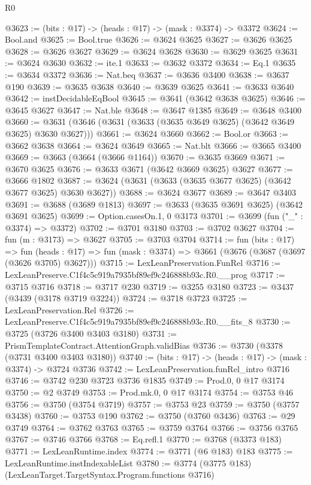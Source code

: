 \begin{lexlean}{R0}
\begin{coremodule}
@3623 := (bits : @17) -> (heads : @17) -> (mask : @3374) -> @3372
@3624 := Bool.and
@3625 := Bool.true
@3626 := @3624 @3625
@3627 := @3626 @3625
@3628 := @3626 @3627
@3629 := @3624 @3628
@3630 := @3629 @3625
@3631 := @3624 @3630
@3632 := ite.{1}
@3633 := @3632 @3372
@3634 := Eq.{1}
@3635 := @3634 @3372
@3636 := Nat.beq
@3637 := @3636 @3400
@3638 := @3637 @190
@3639 := @3635 @3638
@3640 := @3639 @3625
@3641 := @3633 @3640
@3642 := instDecidableEqBool
@3645 := @3641 (@3642 @3638 @3625)
@3646 := @3645 @3627
@3647 := Nat.ble
@3648 := @3647 @1385
@3649 := @3648 @3400
@3660 := @3631 (@3646 (@3631 (@3633 (@3635 @3649 @3625) (@3642 @3649 @3625) @3630 @3627)))
@3661 := @3624 @3660
@3662 := Bool.or
@3663 := @3662 @3638
@3664 := @3624 @3649
@3665 := Nat.blt
@3666 := @3665 @3400
@3669 := @3663 (@3664 (@3666 @1164))
@3670 := @3635 @3669
@3671 := @3670 @3625
@3676 := @3633 @3671 (@3642 @3669 @3625) @3627
@3677 := @3666 @1802
@3687 := @3624 (@3631 (@3633 (@3635 @3677 @3625) (@3642 @3677 @3625) @3630 @3627))
@3688 := @3624 @3677
@3689 := @3647 @3403
@3691 := @3688 (@3689 @1813)
@3697 := @3633 (@3635 @3691 @3625) (@3642 @3691 @3625)
@3699 := Option.casesOn.{1, 0} @3173
@3701 := @3699 (fun ("_" : @3374) => @3372)
@3702 := @3701 @3180
@3703 := @3702 @3627
@3704 := fun (m : @3173) => @3627
@3705 := @3703 @3704
@3714 := fun (bits : @17) =>
  fun (heads : @17) => fun (mask : @3374) => @3661 (@3676 (@3687 (@3697 (@3626 @3705) @3627)))
@3715 := LexLeanPreservation.FunRel
@3716 := LexLeanPreserve.C1f4c5c919a7935bf89ef9c246888b93c.R0.__prog
@3717 := @3715 @3716
@3718 := @3717 @230
@3719 := @3255 @3180
@3723 := @3437 (@3439 (@3178 @3719 @3224))
@3724 := @3718 @3723
@3725 := LexLeanPreservation.Rel
@3726 := LexLeanPreserve.C1f4c5c919a7935bf89ef9c246888b93c.R0.__fits_8
@3730 := @3725 (@3726 @3400 @3403 @3180)
@3731 := PrismTemplateContract.AttentionGraph.validBias
@3736 := @3730 (@3378 (@3731 @3400 @3403 @3180))
@3740 := (bits : @17) -> (heads : @17) -> (mask : @3374) -> @3724 @3736
@3742 := LexLeanPreservation.funRel_intro @3716
@3746 := @3742 @230 @3723 @3736 @1835
@3749 := Prod.{0, 0} @17 @3174
@3750 := @2 @3749
@3753 := Prod.mk.{0, 0} @17 @3174
@3754 := @3753 @46
@3756 := @3750 (@3754 @3719)
@3757 := @3753 @23
@3759 := @3750 (@3757 @3438)
@3760 := @3753 @190
@3762 := @3750 (@3760 @3436)
@3763 := @29 @3749
@3764 := @3762 @3763
@3765 := @3759 @3764
@3766 := @3756 @3765
@3767 := @3746 @3766
@3768 := Eq.refl.{1}
@3770 := @3768 (@3373 @183)
@3771 := LexLeanRuntime.index
@3774 := @3771 (@6 @183) @183
@3775 := LexLeanRuntime.instIndexableList
@3780 := @3774 (@3775 @183) (LexLeanTarget.TargetSyntax.Program.functions @3716)

\end{coremodule}
\end{lexlean}

